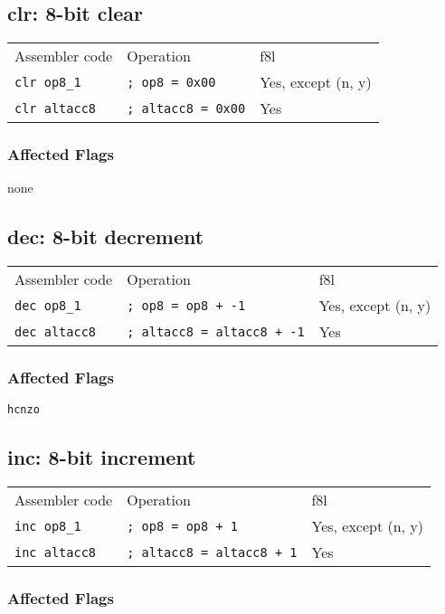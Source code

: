 \documentclass{book}
\begin{document}
\subsection{clr: 8-bit clear}

\begin{tabular}{l l l}
Assembler code       & Operation                 & f8l \\
\texttt{clr op8\_1}  & \texttt{; op8 = 0x00}     & Yes, except (n, y) \\
\texttt{clr altacc8} & \texttt{; altacc8 = 0x00} & Yes
\end{tabular}

\subsubsection*{Affected Flags}

none


\subsection{dec: 8-bit decrement}

\begin{tabular}{l l l}
Assembler code       & Operation                         & f8l \\
\texttt{dec op8\_1}  & \texttt{; op8 = op8 + -1}         & Yes, except (n, y) \\
\texttt{dec altacc8} & \texttt{; altacc8 = altacc8 + -1} & Yes
\end{tabular}

\subsubsection*{Affected Flags}

\texttt{hcnzo}


\subsection{inc: 8-bit increment}

\begin{tabular}{l l l}
Assembler code       & Operation                        & f8l \\
\texttt{inc op8\_1}  & \texttt{; op8 = op8 + 1}         & Yes, except (n, y) \\
\texttt{inc altacc8} & \texttt{; altacc8 = altacc8 + 1} & Yes
\end{tabular}

\subsubsection*{Affected Flags}
\end{document}
